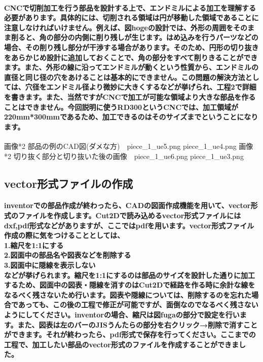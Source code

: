\documentclass[b5paper, 9pt, twocolumn, titlepage,openany]{jsbook}%
\begin{document}
\paragraph{CNCで切削加工を行う部品を設計する上で、エンドミルによる加工を理解する必要があります。具体的には、切削される領域は円が移動した領域であることに注意しなければいけません。例えば、図hogeの設計では、外形の周囲をそのまま削ると、角の部分の内側に削り残しが生じます。はめ込みを行うパーツなどの場合、その削り残し部分が干渉する場合があります。そのため、円形の切り抜きをあらかじめ設計に追加しておくことで、角の部分をすべて削りきることができます。また、外形の線に沿ってエンドミルが動くという性質から、エンドミルの直径と同じ径の穴をあけることは基本的にできません。この問題の解決方法としては、穴径をエンドミル径より微妙に大きくするなどが挙げられ、工程2で詳細を書きます。また、当然ですがCNCで加工が可能な領域より大きな部品を作ることはできません。今回説明に使うRD300というCNCでは、加工領域が220mm*300mmであるため、加工できるのはそのサイズまでということになります。}

画像*2 部品の例のCAD図(ダメな方)　piece_1_ue5.png piece_1_ue4.png
画像*2 切り抜く部分と切り抜いた後の画像　piece_1_ue6.png piece_1_ue3.png

\subsection{vector形式ファイルの作成}
\paragraph{inventorでの部品作成が終わったら、CADの図面作成機能を用いて、vector形式のファイルを作成します。Cut2Dで読み込めるvector形式ファイルにはdxf,pdf形式などがありますが、ここではpdfを用います。vector形式ファイル作成の際に気をつけることとしては、\\
1.縮尺を1:1にする\\
2.図面中の部品名や図表などを削除する\\
3.図面中に隠線を表示しない\\
などが挙げられます。縮尺を1:1にするのは部品のサイズを設計した通りに加工するため、図面中の図表・隠線を消すのはCut2Dで経路を作る時に余計な線をなるべく残さないため行います。図表や隠線については、削除するのを忘れた場合であっても、この後の工程で修正が可能ですが、面倒なのでなるべく残さないようにしてください。inventorの場合、縮尺は図fugaの部分で設定を行います。また、図表は左のバーのJISうんたらの部分を右クリック→削除で消すことができます。それが終わったら、pdf形式で保存を行ってください。ここまでの工程で、加工したい部品のvector形式のファイルを作成することができました。}
\end{document}
